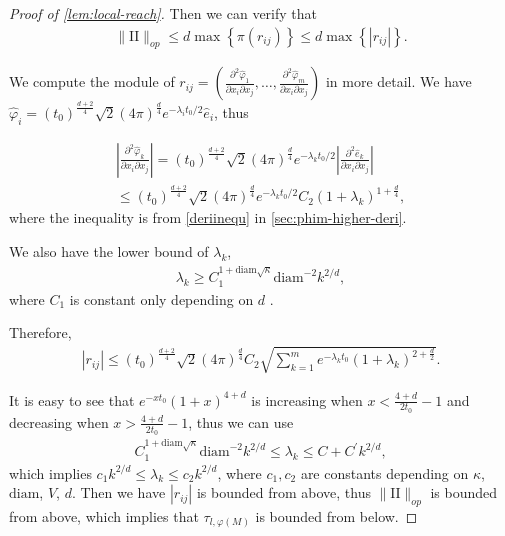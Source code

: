 \begin{proof}[Proof of \cref{lem:local-reach}]
Then we can verify that 
\begin{align}
	\|\mathrm{II}\|_{op} \leq d \max \left\{\pi(r_{ij})\right\}\leq d \max\left\{|r_{ij}|\right\}.
\end{align} 

We compute the module of $r_{ij}=\left(\frac{\partial^2 \hat{\varphi}_1}{\partial x_i \partial x_j},\dots,\frac{\partial^2 \hat{\varphi}_m}{\partial x_i \partial x_j}\right)$ in more detail. We have $\hat{\varphi}_i = (t_0)^\frac{d+2}{4}\sqrt{2}(4\pi)^\frac{d}{4} e^{-\lambda_i t_0/2} \hat{e}_i$, thus

\begin{align}
	\left|\frac{\partial^2 \hat{\varphi}_k}{\partial x_i \partial x_j}\right|=(t_0)^\frac{d+2}{4}\sqrt{2}(4\pi)^\frac{d}{4} e^{-\lambda_k t_0/2} \left|\frac{\partial^2 \hat{e}_k}{\partial x_i \partial x_j}\right| \\
	\leq (t_0)^\frac{d+2}{4}\sqrt{2}(4\pi)^\frac{d}{4} e^{-\lambda_k t_0/2} C_2 (1+\lambda_k)^{1+\frac{d}{4}},
\end{align}
where the inequality is from \cref{deriinequ} in \cref{sec:phim-higher-deri}.

We also have the lower bound of $\lambda_k$, 
\begin{align}
\lambda_k \geq C_1^{1+\text{diam}\sqrt{\kappa}} \text{diam}^{-2} k^{2/d},
\end{align}
where $C_1$ is constant only depending on $d$ \cite[Thm. 1.2.1]{hassannezhad2016eigenvalue}.

Therefore, 
\begin{align}
|r_{ij}|\leq (t_0)^\frac{d+2}{4}\sqrt{2}(4\pi)^\frac{d}{4} C_2\sqrt{\sum_{k=1}^{m}e^{-\lambda_k t_0} (1+\lambda_k)^{2+\frac{d}{2}}}.
\end{align}

It is easy to see that $e^{-x t_0} (1+x)^{4+d}$ is increasing when $x<\frac{4+d}{2t_0}-1$ and decreasing when $x>\frac{4+d}{2t_0}-1$, thus we can use 
\begin{align}
C_1^{1+\text{diam}\sqrt{\kappa}} \text{diam}^{-2} k^{2/d} \leq \lambda_k \leq C+C^\prime k^{2/d},
\end{align}
which implies $c_1 k^{2/d} \leq \lambda_k \leq c_2 k^{2/d}$, where $c_1,c_2$ are constants depending on $\kappa$, $\text{diam}$, $V$, $d$. Then we have $|r_{ij}|$ is bounded from above, thus $\|\mathrm{II}\|_{op}$ is bounded from above, which implies that $\tau_{l,\varphi(M)}$ is bounded from below.
\end{proof}
